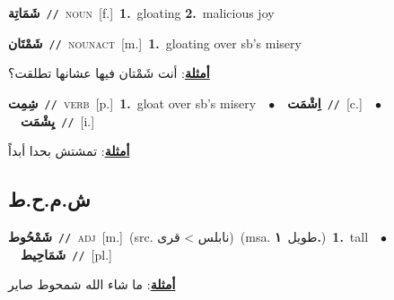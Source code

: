 \documentclass[10pt,a4paper,twoside]{article} %
\begin{document}
\begin{multicols}{2}
{\setlength\topsep{0pt}\textbf{\foreignlanguage{arabic}{شَمَاتِة}}\ {\color{gray}\texttt{//}\color{black}}\ \textsc{noun}\ [f.]\ \textbf{1.}~gloating  \textbf{2.}~malicious joy\ } \vspace{2mm}

{\setlength\topsep{0pt}\textbf{\foreignlanguage{arabic}{شَمْتَان}}\ {\color{gray}\texttt{//}\color{black}}\ \textsc{noun\textunderscore act}\ [m.]\ \textbf{1.}~gloating over sb's misery\  \begin{flushright}\color{gray}\foreignlanguage{arabic}{\textbf{\underline{\foreignlanguage{arabic}{أمثلة}}}: أنت شَمْتان فيها عشانها تطلقت؟}\end{flushright}\color{black}} \vspace{2mm}

{\setlength\topsep{0pt}\textbf{\foreignlanguage{arabic}{شِمِت}}\ {\color{gray}\texttt{//}\color{black}}\ \textsc{verb}\ [p.]\ \textbf{1.}~gloat over sb's misery\ \ $\bullet$\ \ \setlength\topsep{0pt}\textbf{\foreignlanguage{arabic}{اِشْمَت}}\ {\color{gray}\texttt{//}\color{black}}\ [c.]\ \ $\bullet$\ \ \setlength\topsep{0pt}\textbf{\foreignlanguage{arabic}{يِشْمَت}}\ {\color{gray}\texttt{//}\color{black}}\ [i.]\  \begin{flushright}\color{gray}\foreignlanguage{arabic}{\textbf{\underline{\foreignlanguage{arabic}{أمثلة}}}: تمشتش بحدا أبداً}\end{flushright}\color{black}} \vspace{2mm}

\vspace{-3mm}
\subsection*{\color{blue}\foreignlanguage{arabic}{ش.م.ح.ط}\color{blue}{ (ntws)}} 

{\setlength\topsep{0pt}\textbf{\foreignlanguage{arabic}{شَمْحُوط}}\ {\color{gray}\texttt{//}\color{black}}\ \textsc{adj}\ [m.]\ (src. \color{gray}\foreignlanguage{arabic}{نابلس > قرى}\color{black})\ \color{gray}(msa. \foreignlanguage{arabic}{طويل}~\foreignlanguage{arabic}{\textbf{١.}})\color{black}\ \textbf{1.}~tall\ \ $\bullet$\ \ \setlength\topsep{0pt}\textbf{\foreignlanguage{arabic}{شَمَاحِيط}}\ {\color{gray}\texttt{//}\color{black}}\ [pl.]\  \begin{flushright}\color{gray}\foreignlanguage{arabic}{\textbf{\underline{\foreignlanguage{arabic}{أمثلة}}}: ما شاء الله شمحوط صاير}\end{flushright}\color{black}} \vspace{2mm}


\end{multicols}
\end{document}
